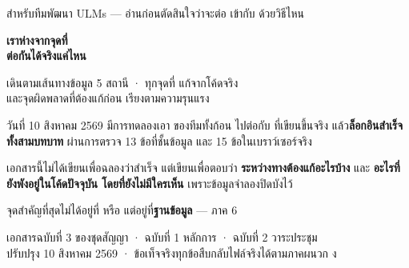 \begin{titlepage}
\thispagestyle{empty}

\vspace*{1.4cm}
{\sansall\color{muted}\small สำหรับทีมพัฒนา ULMs --- อ่านก่อนตัดสินใจว่าจะต่อ  เข้ากับ  ด้วยวิธีไหน}

\vspace{0.9cm}
{\sansall\bfseries\fontsize{27}{33}\selectfont\color{ctr!90!black}
เราห่างจากจุดที่\\ต่อกันได้จริงแค่ไหน\par}

\vspace{0.5cm}
{\sansall\fontsize{13.5}{19}\selectfont\color{ink}
เดินตามเส้นทางข้อมูล 5 สถานี · ทุกจุดที่  แก้จากโค้ดจริง\\
และจุดผิดพลาดที่ต้องแก้ก่อน เรียงตามความรุนแรง\par}

\vspace{2.6cm}

\begin{minipage}{0.68\textwidth}
วันที่ 10 สิงหาคม 2569 มีการทดลองเอา  ของทีมทั้งก้อน
ไปต่อกับ  ที่เขียนขึ้นจริง แล้ว\textbf{ล็อกอินสำเร็จทั้งสามบทบาท}
ผ่านการตรวจ 13 ข้อที่ชั้นข้อมูล และ 15 ข้อในเบราว์เซอร์จริง

\vspace{0.6em}
เอกสารนี้ไม่ได้เขียนเพื่อฉลองว่าสำเร็จ แต่เขียนเพื่อตอบว่า
\textbf{ระหว่างทางต้องแก้อะไรบ้าง} และ \textbf{อะไรที่ยังพังอยู่ในโค้ดปัจจุบัน
โดยที่ยังไม่มีใครเห็น} เพราะข้อมูลจำลองปิดบังไว้

\vspace{0.6em}
จุดสำคัญที่สุดไม่ได้อยู่ที่  หรือ 
แต่อยู่ที่\textbf{ฐานข้อมูล} --- ภาค 6
\end{minipage}

\vfill
{}
\vspace{0.4em}

{\sansall\footnotesize\color{muted}
เอกสารฉบับที่ 3 ของชุดสัญญา  · ฉบับที่ 1  หลักการ ·
ฉบับที่ 2  วาระประชุม\\
ปรับปรุง 10 สิงหาคม 2569 · ข้อเท็จจริงทุกข้อสืบกลับไฟล์จริงได้ตามภาคผนวก ง}
\end{titlepage}

